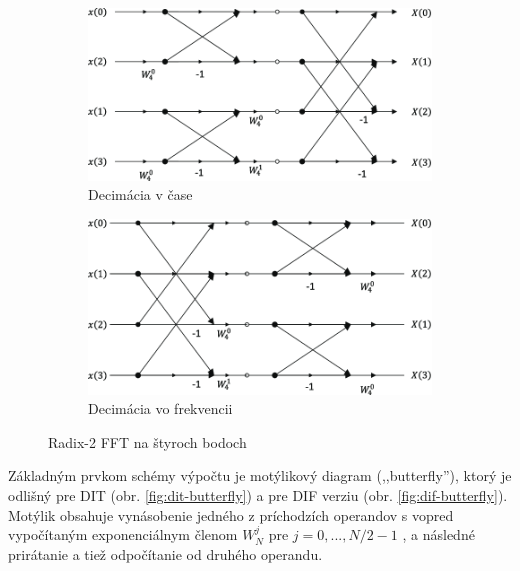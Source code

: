 \begin{figure}[h]
\centering
\begin{subfigure}[b]{0.48\textwidth}
    \centering
    \includegraphics[width=\textwidth]{figures/analysis/Length-4-DIT-radix-2-FFT.png}
    \caption{Decimácia v čase}
    \label{fig:dit-fft}
\end{subfigure}
\hfill
\begin{subfigure}[b]{0.48\textwidth}
    \centering
    \includegraphics[width=\textwidth]{figures/analysis/Length-4-DIF-radix-2-FFT.png}
    \caption{Decimácia vo frekvencii}
    \label{fig:dif-fft}
\end{subfigure}
\caption{Radix-2 FFT na štyroch bodoch \cite{dit-dif-fft}}
\end{figure}

Základným prvkom schémy výpočtu je motýlikový diagram (,,butterfly''), ktorý je odlišný pre DIT (obr. \ref{fig:dit-butterfly})
a pre DIF verziu (obr. \ref{fig:dif-butterfly}). Motýlik obsahuje vynásobenie
jedného z príchodzích operandov s vopred vypočítaným exponenciálnym členom $W_N^j$ pre $j = 0, ..., N/2 - 1$
\cite{fft-blackbox}, a následné prirátanie a tiež odpočítanie od druhého operandu.

